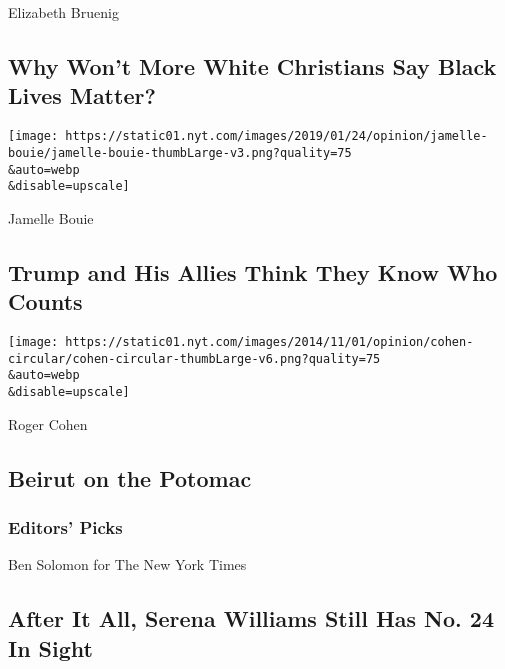 Elizabeth Bruenig

\hypertarget{why-wont-more-white-christians-say-black-lives-matter}{%
\subsection{Why Won't More White Christians Say Black Lives
Matter?}\label{why-wont-more-white-christians-say-black-lives-matter}}

\href{/2020/08/07/opinion/trump-2020-census.html}{}

\texttt{[image: https://static01.nyt.com/images/2019/01/24/opinion/jamelle-bouie/jamelle-bouie-thumbLarge-v3.png?quality=75\\\&auto=webp\\\&disable=upscale]}

Jamelle Bouie

\hypertarget{trump-and-his-allies-think-they-know-who-counts}{%
\subsection{Trump and His Allies Think They Know Who
Counts}\label{trump-and-his-allies-think-they-know-who-counts}}

\href{/2020/08/07/opinion/beirut-explosion.html}{}

\texttt{[image: https://static01.nyt.com/images/2014/11/01/opinion/cohen-circular/cohen-circular-thumbLarge-v6.png?quality=75\\\&auto=webp\\\&disable=upscale]}

Roger Cohen

\hypertarget{beirut-on-the-potomac}{%
\subsection{Beirut on the Potomac}\label{beirut-on-the-potomac}}

\hypertarget{editors-picks}{%
\subsubsection{Editors' Picks}\label{editors-picks}}

\href{/2020/08/07/sports/tennis/serena-williams-us-open.html}{}

Ben Solomon for The New York Times

\href{/2020/08/07/sports/tennis/serena-williams-us-open.html}{}

\hypertarget{after-it-all-serena-williams-still-has-no-24-in-sight}{%
\subsection{After It All, Serena Williams Still Has No. 24 In
Sight}\label{after-it-all-serena-williams-still-has-no-24-in-sight}}

